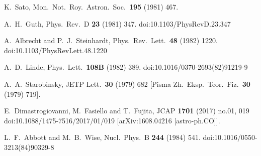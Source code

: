\documentclass[tightenlines,floats,aps,nofootinbib,prd,onecolumn,preprintnumbers]{revtex4}
\begin{document}
\begin{thebibliography}{5}
  K.~Sato,
  Mon.\ Not.\ Roy.\ Astron.\ Soc.\  {\bf 195} (1981) 467.

  A.~H.~Guth,
  Phys.\ Rev.\ D {\bf 23} (1981) 347.
  doi:10.1103/PhysRevD.23.347

  A.~Albrecht and P.~J.~Steinhardt,
  Phys.\ Rev.\ Lett.\  {\bf 48} (1982) 1220.
  doi:10.1103/PhysRevLett.48.1220

  A.~D.~Linde,
  Phys.\ Lett.\  {\bf 108B} (1982) 389.
  doi:10.1016/0370-2693(82)91219-9

  A.~A.~Starobinsky,
  JETP Lett.\  {\bf 30} (1979) 682
   [Pisma Zh.\ Eksp.\ Teor.\ Fiz.\  {\bf 30} (1979) 719].

  E.~Dimastrogiovanni, M.~Fasiello and T.~Fujita,
  JCAP {\bf 1701} (2017) no.01,  019
  doi:10.1088/1475-7516/2017/01/019
  [arXiv:1608.04216 [astro-ph.CO]].

  L.~F.~Abbott and M.~B.~Wise,
  Nucl.\ Phys.\ B {\bf 244} (1984) 541.
  doi:10.1016/0550-3213(84)90329-8


\end{thebibliography}
\end{document}
